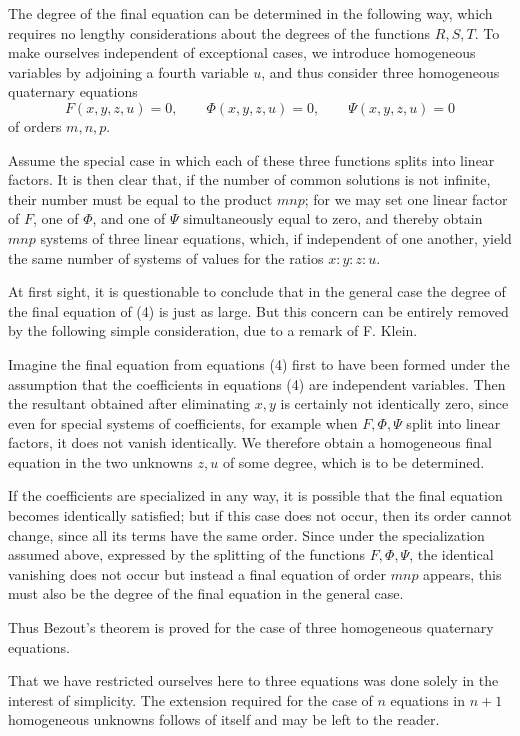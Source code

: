 \documentclass[11pt]{article}
\begin{document}
The degree of the final equation can be determined in the following way, which requires no lengthy considerations about the degrees of the functions $R,S,T$. To make ourselves independent of exceptional cases, we introduce homogeneous variables by adjoining a fourth variable $u$, and thus consider three homogeneous quaternary equations
\begin{equation}
F(x,y,z,u)=0,
\qquad
\Phi(x,y,z,u)=0,
\qquad
\Psi(x,y,z,u)=0
\tag{4}
\end{equation}
of orders $m,n,p$.

Assume the special case in which each of these three functions splits into linear factors. It is then clear that, if the number of common solutions is not infinite, their number must be equal to the product $mnp$; for we may set one linear factor of $F$, one of $\Phi$, and one of $\Psi$ simultaneously equal to zero, and thereby obtain $mnp$ systems of three linear equations, which, if independent of one another, yield the same number of systems of values for the ratios $x:y:z:u$.

At first sight, it is questionable to conclude that in the general case the degree of the final equation of (4) is just as large. But this concern can be entirely removed by the following simple consideration, due to a remark of F. Klein.

Imagine the final equation from equations (4) first to have been formed under the assumption that the coefficients in equations (4) are independent variables. Then the resultant obtained after eliminating $x,y$ is certainly not identically zero, since even for special systems of coefficients, for example when $F,\Phi,\Psi$ split into linear factors, it does not vanish identically. We therefore obtain a homogeneous final equation in the two unknowns $z,u$ of some degree, which is to be determined.

If the coefficients are specialized in any way, it is possible that the final equation becomes identically satisfied; but if this case does not occur, then its order cannot change, since all its terms have the same order. Since under the specialization assumed above, expressed by the splitting of the functions $F,\Phi,\Psi$, the identical vanishing does not occur but instead a final equation of order $mnp$ appears, this must also be the degree of the final equation in the general case.

Thus Bezout's theorem is proved for the case of three homogeneous quaternary equations.

That we have restricted ourselves here to three equations was done solely in the interest of simplicity. The extension required for the case of $n$ equations in $n+1$ homogeneous unknowns follows of itself and may be left to the reader.
\end{document}

